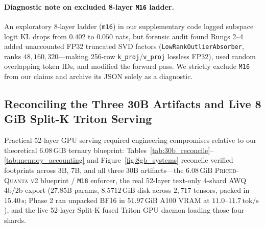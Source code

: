 \documentclass[10pt]{article} %
\newcommand{\pqv}{\textsc{Priced-Quanta v2}}
\begin{document}
\paragraph{Diagnostic note on excluded 8-layer \texttt{M16} ladder.}
An exploratory 8-layer ladder (\texttt{m16}) in our supplementary code logged subspace logit KL drops from $0.402$ to $0.050$ nats, but forensic audit found Rungs 2--4 added unaccounted FP32 truncated SVD factors (\texttt{LowRankOutlierAbsorber}, ranks $48, 160, 320$---making 256-row \texttt{k\_proj}/\texttt{v\_proj} lossless FP32), used random overlapping token IDs, and modified the forward pass. We strictly exclude \texttt{M16} from our claims and archive its JSON solely as a diagnostic.

\subsection{Reconciling the Three 30B Artifacts and Live 8 GiB Split-K Triton Serving}
\label{sec:30b_serving}

Practical 52-layer GPU serving required engineering compromises relative to our theoretical $6.08\,\text{GiB}$ ternary blueprint: Tables~\ref{tab:30b_reconcile}--\ref{tab:memory_accounting} and Figure~\ref{fig:8gb_systems} reconcile verified footprints across 3B, 7B, and all three 30B artifacts---the $6.08\,\text{GiB}$ \pqv{} blueprint / \texttt{M18} enforcer, the real 52-layer text-only 4-shard AWQ 4b/2b export ($27.85\text{B}$ params, $8.5712\,\text{GiB}$ disk across $2{,}717$ tensors, packed in $15.40\,\text{s}$; Phase 2 ran unpacked BF16 in $51.97\,\text{GiB}$ A100 VRAM at $11.0$--$11.7\,\text{tok/s}$), and the live 52-layer Split-K fused Triton GPU daemon loading those four shards.
\end{document}
